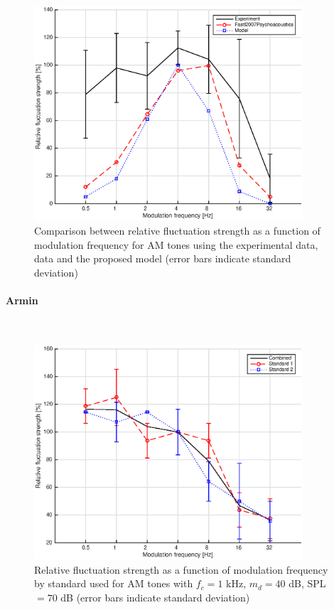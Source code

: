 \documentclass[a4paper]{article}
\begin{document}
\begin{figure}[H]
    \centering
    \includegraphics[height=8cm]{img/AM_tones-fm-results-AO-comparison}
    \caption{Comparison between relative fluctuation strength as a function of
        modulation frequency for AM tones using the experimental data,
        \citeauthor{Fastl2007Psychoacoustics} data and the proposed model
        (error bars indicate standard deviation)}
\end{figure}

\paragraph{Armin} ~\\

\begin{figure}[H]
    \centering
    \includegraphics[height=8cm]{img/AM_tones-fm-results-Armin-standards}
    \caption{Relative fluctuation strength as a function of modulation
        frequency by standard used for AM tones with $f_c = 1$ kHz, $m_d = 40$
        dB, SPL $= 70$ dB (error bars indicate standard deviation)}
\end{figure}
\end{document}
